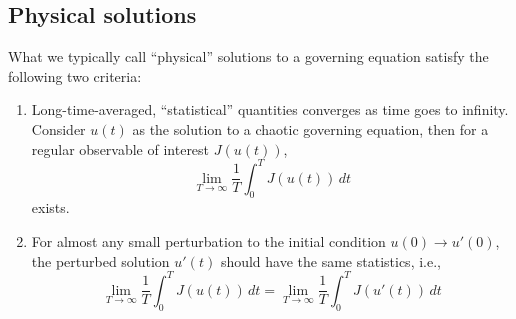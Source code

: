 \subsection{Physical solutions}
What we typically call ``physical'' solutions to a governing equation satisfy the following
two criteria: 
\begin{enumerate}
    \item Long-time-averaged, ``statistical'' quantities converges as time goes to infinity.
    Consider $u(t)$ as the solution to a chaotic governing equation, then for a regular observable
    of interest $J(u(t))$,
    \begin{equation} \label{longtimeavg}
        \lim_{T\to\infty}\frac1T \int_0^T J(u(t))\,dt
    \end{equation}
    exists.
    \item For almost any small perturbation to the initial condition $u(0)\to u'(0)$, the perturbed
    solution $u'(t)$ should have the same statistics, i.e.,
    \begin{equation}
        \lim_{T\to\infty}\frac1T \int_0^T J(u(t))\,dt
      = \lim_{T\to\infty}\frac1T \int_0^T J(u'(t))\,dt
    \end{equation}
\end{enumerate}

